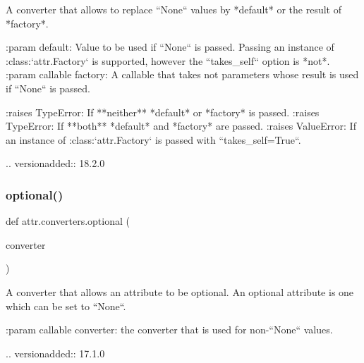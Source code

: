 \begin{DoxyVerb}A converter that allows to replace ``None`` values by *default* or the
result of *factory*.

:param default: Value to be used if ``None`` is passed. Passing an instance
   of :class:`attr.Factory` is supported, however the ``takes_self`` option
   is *not*.
:param callable factory: A callable that takes not parameters whose result
   is used if ``None`` is passed.

:raises TypeError: If **neither** *default* or *factory* is passed.
:raises TypeError: If **both** *default* and *factory* are passed.
:raises ValueError: If an instance of :class:`attr.Factory` is passed with
   ``takes_self=True``.

.. versionadded:: 18.2.0
\end{DoxyVerb}
 \mbox{\label{namespaceattr_1_1converters_a9573ca901d271a4af620f1d12ee9c63c}} 
\subsubsection{\texorpdfstring{optional()}{optional()}}
{\footnotesize\ttfamily def attr.\+converters.\+optional (\begin{DoxyParamCaption}\item[{}]{converter }\end{DoxyParamCaption})}

\begin{DoxyVerb}A converter that allows an attribute to be optional. An optional attribute
is one which can be set to ``None``.

:param callable converter: the converter that is used for non-``None``
    values.

.. versionadded:: 17.1.0
\end{DoxyVerb}
 